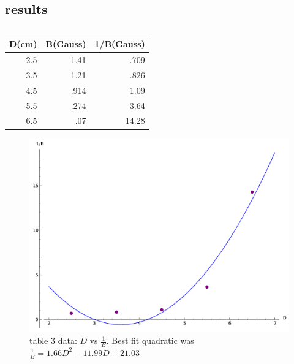 \documentclass[12pt]{article}
\begin{document}
\subsection*{results} 
	\begin{table}[h]
	\caption{}
	\centering
	\begin{tabular}{|r|r|r|}
	\hline 
	D(cm) & B(Gauss) & 1/B(Gauss) \\
	\hline 
	2.5 & 1.41 & .709 \\
	3.5 & 1.21 & .826 \\
	4.5 & .914 & 1.09 \\
	5.5 & .274 & 3.64 \\
	6.5 & .07 & 14.28 \\
	\hline
	\end{tabular}
	\end{table}

	\begin{figure}[hp]
	 \centering
	 \includegraphics[scale = .85]{plot3}
	 \caption*{table 3 data: $D$ vs $\frac{1}{B}$. Best fit quadratic was $ \frac{1}{B} = 1.66D^2  - 11.99D + 21.03 $}
	\end{figure} 
\end{document}
